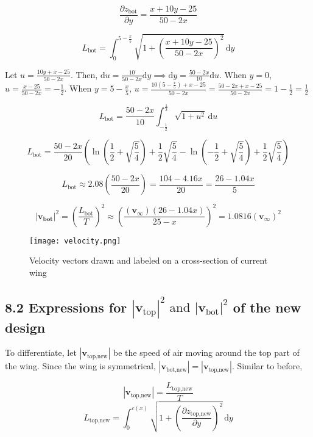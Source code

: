 \documentclass[12pt]{article}
\begin{document}
\[ \frac{\partial z_{\text{bot}}}{\partial y} = \frac{x + 10y - 25}{50 - 2x} \]

\[ L_{\text{bot}} = \int_0^{5 - \frac{x}{5}} \sqrt{1 +\left( \frac{x + 10y - 25}{50 - 2x}\right)^2} \, \mathrm{d}y\]

Let $u = \frac{10y + x -25}{50 - 2x}$. Then, $\mathrm{d}u = \frac{10}{50 - 2x}\mathrm{d}y \implies \mathrm{d}y = \frac{50 - 2x}{10} \mathrm{d}u$. When $y = 0$, $u = \frac{x - 25}{50 - 2x} = -\frac{1}{2}$. When $y = 5 - \frac{x}{5}$, $u = \frac{10(5 - \frac{x}{5}) + x - 25}{50 - 2x} = \frac{50 - 2x + x - 25}{50 - 2x} = 1 - \frac{1}{2} = \frac{1}{2} $

\[ L_{\text{bot}} = \frac{50 - 2x}{10}\int_{-\frac{1}{2}}^{\frac{1}{2}} \sqrt{1 + u^2} \, \mathrm{d}u\]

\[ L_{\text{bot}} = \frac{50 - 2x}{20} \left(\ln\left(\frac{1}{2} + \sqrt{\frac{5}{4}}\right) + \frac{1}{2}\sqrt{\frac{5}{4}} - \ln\left(-\frac{1}{2} + \sqrt{\frac{5}{4}}\right) + \frac{1}{2}\sqrt{\frac{5}{4}}\right) \]

\[ L_{\text{bot}} \approx 2.08\left(\frac{50 - 2x}{20}\right) = \frac{104 - 4.16x}{20} = \frac{26 - 1.04x}{5} \]

\[ |\mathbf{v_{\text{bot}}}|^2 = \left(\frac{L_\text{bot}}{T}\right)^2 \approx \left(\frac{(\mathbf{v}_{\infty})(26 - 1.04x)}{25 - x}\right)^2 = 1.0816(\mathbf{v}_{\infty})^2 \]

\begin{figure}[H]
    \centering
    \texttt{[image: velocity.png]}
    \caption{Velocity vectors drawn and labeled on a cross-section of current wing}
\end{figure}




\subsection*{8.2 Expressions for \(|\mathbf{v}_{\text{top}}|^2 \text{ and } |\mathbf{v}_{\text{bot}}|^2 \) of the new design}

To differentiate, let $|\mathbf{v}_{\text{top,new}}|$ be the speed of air moving around the top part of the wing. Since the wing is symmetrical, $|\mathbf{v}_{\text{bot,new}}| = |\mathbf{v}_{\text{top,new}}|$. Similar to before,

\[|\mathbf{v}_{\text{top,new}}| = \frac{L_{\text{top,new}}}{T}\]
\[ L_{\text{top,new}} = \int_0^{c(x)} \sqrt{1 + \left( \frac{\partial z_{\text{top,new}}}{\partial y}\right)^2} \, \mathrm{d}y\]
\end{document}
